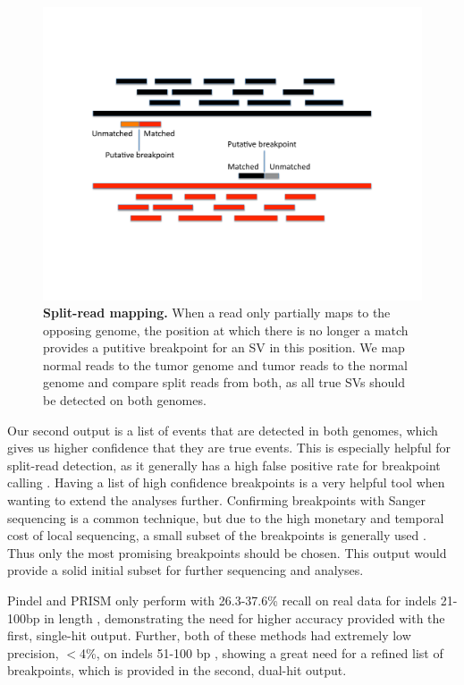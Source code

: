 \documentclass{easychithesis}
\begin{document}
\begin{figure}[!ht]
\begin{center}
\includegraphics[width = 0.95  \linewidth]{../Code/Figures/SplitReadMapping.pdf}
\end{center}
\caption{{\bf Split-read mapping.}  When a read only partially maps to the opposing genome, the position at which there is no longer a match provides a putitive breakpoint for an SV in this position. We map normal reads to the tumor genome and tumor reads to the normal genome and compare split reads from both, as all true SVs should be detected on both genomes.}
\label{fig:SplitReadMapping}
\end{figure}

Our second output is a list of events that are detected in both genomes, which gives us higher confidence that they are true events. This is especially helpful for split-read detection, as it generally has a high false positive rate for breakpoint calling \cite{abel2013detection}. Having a list of high confidence breakpoints is a very helpful tool when wanting to extend the analyses further. Confirming breakpoints with Sanger sequencing is a common technique, but due to the high monetary and temporal cost of local sequencing, a small subset of the breakpoints is generally used \cite{jiang2012prism}. Thus only the most promising breakpoints should be chosen. This output would provide a solid initial subset for further sequencing and analyses.

Pindel and PRISM only perform with 26.3-37.6\% recall on real data for indels 21-100bp in length \cite{jiang2012prism}, demonstrating the need for higher accuracy provided with the first, single-hit output. Further, both of these methods had extremely low precision, $<$4\%, on indels 51-100 bp \cite{jiang2012prism}, showing a great need for a refined list of breakpoints, which is provided in the second, dual-hit output.
\end{document}

